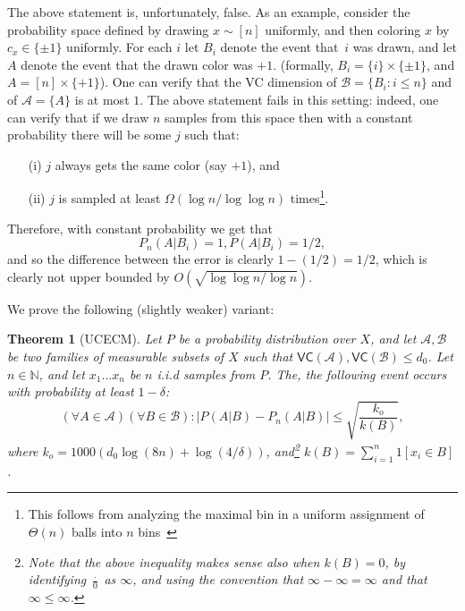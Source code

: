 \documentclass{article}
\def\B{{\mathcal B}}
\newcommand{\cA}{\mathcal{A}}
\newcommand{\cB}{\mathcal{B}}
\newtheorem{theorem}{Theorem}
\begin{document}
The above statement is, unfortunately, false. 
As an example, consider the probability space defined by drawing $x \sim[n]$ uniformly,
and then coloring $x$ by $c_x\in\{\pm 1\}$ uniformly.
For each $i$ let $B_i$ denote the event that~$i$ was drawn,
and let $A$ denote the event that the drawn color was  $+1$.
(formally, $B_i = \{i\}\times\{\pm 1\}$, and $A=[n]\times\{+1\}$).
One can verify that the VC dimension of $\B=\{B_i : i\leq n\}$ and of $\cA=\{A\}$ is at most $1$.
The above statement fails in this setting:
indeed, one can verify that if we draw $n$ samples from this space 
then with a constant probability there will be some  $j$
such that: 
\begin{itemize}
\item[(i)] $j$ always gets the same color (say $+1$), and 
\item[(ii)] $j$ is sampled at least $\Omega(\log n/\log\log n)$ times\footnote{{This follows from analyzing the maximal bin
in a uniform assignment of $\Theta(n)$ balls into $n$ bins~\cite{bins}}}.
\end{itemize}
Therefore, with constant probability we get that 
\[P_n(A\vert B_i) = 1, P(A\vert B_i)=1/2,\]
and so the difference between the error is clearly $1-(1/2)=1/2$,
which is clearly not upper bounded by $O(\sqrt{\log\log n/\log n})$.

We prove the following (slightly weaker) variant:
\begin{theorem}[UCECM]\label{thm:UCECM}
Let $P$ be a probability distribution over $X$, and let $\cA,\cB$
be two families of measurable subsets of $X$ such that $\mathsf{VC}(\cA),\mathsf{VC}(\cB)\leq d_0$.
Let $n\in\mathbb{N}$, and let $x_1\ldots x_n$ be $n$ i.i.d samples from $P$.
The, the following event occurs with probability at least $1-\delta$:
\[\left(\forall A\in\cA\right)\left(\forall B\in\B\right):\left\lvert P(A \vert B) - P_n(A \vert B) \right\rvert \leq 
\sqrt{\frac{k_o}{k(B)}},\]
where $k_o = 1000 \left(d_0 \log(8n) + \log(4/\delta)\right)$, and\footnote{Note that the above inequality makes sense also when $k(B)=0$,
by identifying $\frac{\cdot}{0}$ as $\infty$, and using the convention that $\infty-\infty=\infty$ and that $\infty\leq \infty$.} $k(B) = \sum_{i=1}^n 1[x_i\in B]$.
\end{theorem}
\end{document}
